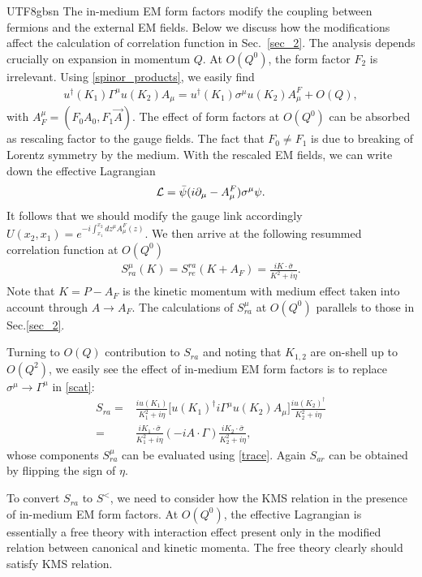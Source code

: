 \documentclass[11pt]{article}\def\baselinestretch{1.4}
\def\G{{\Gamma}}
\def\h{\eta}
\def\m{{\mu}}
\def\s{{\sigma}}
\newcommand{\pd}{{\partial}}
\newcommand{\dg}{\dagger}
\begin{document}
\begin{CJK}{UTF8}{gbsn}
The in-medium EM form factors modify the coupling between fermions and the external EM fields. Below we discuss how the modifications affect the calculation of correlation function in Sec.~\ref{sec_2}. The analysis depends crucially on expansion in momentum $Q$.
At $O(Q^0)$, the form factor $F_2$ is irrelevant. Using \eqref{spinor_products}, we easily find
\begin{align}
u^\dg(K_1)\G^\m u(K_2)A_\m=u^\dg(K_1)\s^\m u(K_2)A^F_\m+O(Q),
\end{align}
with $A_F^\m=(F_0 A_0,F_1 \vec{A})$. The effect of form factors at $O(Q^0)$ can be absorbed as rescaling factor to the gauge fields. The fact that $F_0\ne F_1$ is due to breaking of Lorentz symmetry by the medium. With the rescaled EM fields, we can write down the effective Lagrangian
\begin{align}\label{Lag_F}
{\cal L}=\bar{\psi}(i\pd_\m-A^F_\m)\s^\m\psi.
\end{align}
It follows that we should modify the gauge link accordingly $U(x_2,x_1)=e^{-i\int_{x_1}^{x_2} dz^\m A^F_\m(z)}$.
We then arrive at the following resummed correlation function at $O(Q^0)$
\begin{align}
S_{ra}^\m(K)=S_{re}^{ra}(K+A_F)=\frac{iK\cdot\bar{\s}}{K^2+i\h}.
\end{align}
Note that $K=P-A_F$ is the kinetic momentum with medium effect taken into account through $A\to A_F$. The calculations of $S_{ra}^\m$ at $O(Q^0)$ parallels to those in Sec.\ref{sec_2}.

Turning to $O(Q)$ contribution to $S_{ra}$ and noting that $K_{1,2}$ are on-shell up to $O(Q^2)$, we easily see the effect of in-medium EM form factors is to replace $\s^\m\to\G^\m$ in \eqref{scat}:
\begin{align}\label{S_ra_EM form factors}
S_{ra}=&\frac{iu(K_1)}{K_1^2+i\h}\big[u(K_1)^\dg i\G^\m u(K_2)A_\m\big]\frac{iu(K_2)^\dg}{K_2^2+i\h}\nonumber\\
=&\frac{iK_1\cdot\bar{\s}}{K_1^2+i\h}(-i A\cdot\G)\frac{iK_2\cdot\bar{\s}}{K_2^2+i\h},
\end{align}
whose components $S_{ra}^\m$ can be evaluated using \eqref{trace}. Again $S_{ar}$ can be obtained by flipping the sign of $\h$.

To convert $S_{ra}$ to $S^<$, we need to consider how the KMS relation in the presence of in-medium EM form factors. At $O(Q^0)$, the effective Lagrangian is essentially a free theory with interaction effect present only in the modified relation between canonical and kinetic momenta. The free theory clearly should satisfy KMS relation.


\end{CJK}
\end{document}
